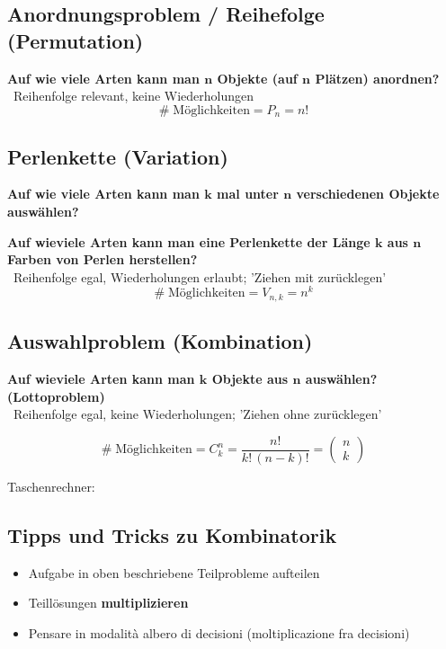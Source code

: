 \subsection{Anordnungsproblem / Reihefolge (Permutation)}

\textbf{Auf wie viele Arten kann man $\bm{n}$ Objekte (auf $\bm{n}$ Plätzen) anordnen?} \\
\textrightarrow\ Reihenfolge relevant, keine Wiederholungen
$$ \boxed{ \text{\#} \; \text{Möglichkeiten} = P_n = n! }$$


\subsection{Perlenkette (Variation)}
\textbf{Auf wie viele Arten kann man $\bm{k}$ mal unter $\bm{n}$ verschiedenen Objekte auswählen?}

\vspace{0.1cm}
\textbf{Auf wieviele Arten kann man eine Perlenkette der Länge $\bm{k}$ aus $\bm{n}$ Farben von Perlen herstellen?} \\
\textrightarrow\ Reihenfolge egal, Wiederholungen erlaubt; 'Ziehen mit zurücklegen'
$$\boxed{ \text{\#} \; \text{Möglichkeiten} = V_{n,k} = n^k } $$ 


\subsection{Auswahlproblem (Kombination)}

\textbf{Auf wieviele Arten kann man $\bm{k}$ Objekte aus $\bm{n}$ auswählen? (Lottoproblem)} \\
\textrightarrow\ Reihenfolge egal, keine Wiederholungen; 'Ziehen ohne zurücklegen'

$$\boxed{ \text{\#} \; \text{Möglichkeiten} = C_k^n = \frac{n!}{k! \, (n-k)!} = 
\begin{pmatrix} n \\ k \end{pmatrix} } $$ 

Taschenrechner: 


\subsection{Tipps und Tricks zu Kombinatorik}
\begin{itemize}
	\item Aufgabe in oben beschriebene Teilprobleme aufteilen
	\item Teillösungen \textbf{multiplizieren}
	\item Pensare in modalità albero di decisioni (moltiplicazione fra decisioni)
\end{itemize}


